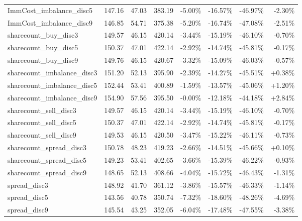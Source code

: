 \begin{table}[ht]
{\begin{tabular}{lRRR|RRRR}
ImmCost\_imbalance\_disc5      &    147.16 &   47.03 &  383.19 &   -5.00\% &  -16.57\% &  -46.97\% &       -2.30\% \\
ImmCost\_imbalance\_disc9      &    146.85 &   54.71 &  375.38 &   -5.20\% &  -16.74\% &  -47.08\% &       -2.51\% \\
sharecount\_buy\_disc3         &    149.57 &   46.15 &  420.14 &   -3.44\% &  -15.19\% &  -46.10\% &       -0.70\% \\
sharecount\_buy\_disc5         &    150.37 &   47.01 &  422.14 &   -2.92\% &  -14.74\% &  -45.81\% &       -0.17\% \\
sharecount\_buy\_disc9         &    149.76 &   46.15 &  420.67 &   -3.32\% &  -15.09\% &  -46.03\% &       -0.57\% \\
sharecount\_imbalance\_disc3   &    151.20 &   52.13 &  395.90 &   -2.39\% &  -14.27\% &  -45.51\% &        +0.38\% \\
sharecount\_imbalance\_disc5   &    152.44 &   53.41 &  400.89 &   -1.59\% &  -13.57\% &  -45.06\% &        +1.20\% \\
sharecount\_imbalance\_disc9   &    154.90 &   57.56 &  395.50 &   -0.00\% &  -12.18\% &  -44.18\% &        +2.84\% \\
sharecount\_sell\_disc3        &    149.57 &   46.15 &  420.14 &   -3.44\% &  -15.19\% &  -46.10\% &       -0.70\% \\
sharecount\_sell\_disc5        &    150.37 &   47.01 &  422.14 &   -2.92\% &  -14.74\% &  -45.81\% &       -0.17\% \\
sharecount\_sell\_disc9        &    149.53 &   46.15 &  420.50 &   -3.47\% &  -15.22\% &  -46.11\% &       -0.73\% \\
sharecount\_spread\_disc3      &    150.78 &   48.23 &  419.23 &   -2.66\% &  -14.51\% &  -45.66\% &        +0.10\% \\
sharecount\_spread\_disc5      &    149.23 &   53.41 &  402.65 &   -3.66\% &  -15.39\% &  -46.22\% &       -0.93\% \\
sharecount\_spread\_disc9      &    148.65 &   52.13 &  408.66 &   -4.04\% &  -15.72\% &  -46.43\% &       -1.31\% \\
spread\_disc3                 &    148.92 &   41.70 &  361.12 &   -3.86\% &  -15.57\% &  -46.33\% &       -1.14\% \\
spread\_disc5                 &    143.56 &   40.78 &  350.74 &   -7.32\% &  -18.60\% &  -48.26\% &       -4.69\% \\
spread\_disc9                 &    145.54 &   43.25 &  352.05 &   -6.04\% &  -17.48\% &  -47.55\% &       -3.38\% \\

\end{tabular}}
\end{table}
